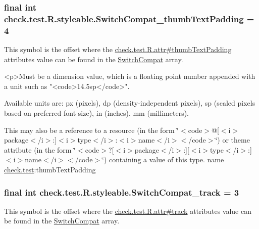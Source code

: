 \subsubsection[{Switch\+Compat\+\_\+thumb\+Text\+Padding}]{\setlength{\rightskip}{0pt plus 5cm}final int check.\+test.\+R.\+styleable.\+Switch\+Compat\+\_\+thumb\+Text\+Padding = 4\hspace{0.3cm}{\ttfamily [static]}}\label{classcheck_1_1test_1_1_r_1_1styleable_a95c824ebefc72184d7d92ae14058c7c4}
This symbol is the offset where the \hyperlink{classcheck_1_1test_1_1_r_1_1attr_a8e826d9b4743add8c93af83988130b52}{check.\+test.\+R.\+attr\#thumb\+Text\+Padding} attribute\textquotesingle{}s value can be found in the \hyperlink{classcheck_1_1test_1_1_r_1_1styleable_a0c8f3659ebec12826f8a2493fe43eaf4}{Switch\+Compat} array.

\begin{DoxyVerb}      <p>Must be a dimension value, which is a floating point number appended with a unit such as "<code>14.5sp</code>".
\end{DoxyVerb}
 Available units are\+: px (pixels), dp (density-\/independent pixels), sp (scaled pixels based on preferred font size), in (inches), mm (millimeters). 

This may also be a reference to a resource (in the form \char`\"{}$<$code$>$@\mbox{[}$<$i$>$package$<$/i$>$\+:\mbox{]}$<$i$>$type$<$/i$>$\+:$<$i$>$name$<$/i$>$$<$/code$>$\char`\"{}) or theme attribute (in the form \char`\"{}$<$code$>$?\mbox{[}$<$i$>$package$<$/i$>$\+:\mbox{]}\mbox{[}$<$i$>$type$<$/i$>$\+:\mbox{]}$<$i$>$name$<$/i$>$$<$/code$>$\char`\"{}) containing a value of this type.  name \hyperlink{namespacecheck_1_1test}{check.\+test}\+:thumb\+Text\+Padding \hypertarget{classcheck_1_1test_1_1_r_1_1styleable_a96e29bef8e291fd5b97d301aaab3e463}{}
\subsubsection[{Switch\+Compat\+\_\+track}]{\setlength{\rightskip}{0pt plus 5cm}final int check.\+test.\+R.\+styleable.\+Switch\+Compat\+\_\+track = 3\hspace{0.3cm}{\ttfamily [static]}}\label{classcheck_1_1test_1_1_r_1_1styleable_a96e29bef8e291fd5b97d301aaab3e463}
This symbol is the offset where the \hyperlink{classcheck_1_1test_1_1_r_1_1attr_a96007b76e63444b819a9c38ff1451df1}{check.\+test.\+R.\+attr\#track} attribute\textquotesingle{}s value can be found in the \hyperlink{classcheck_1_1test_1_1_r_1_1styleable_a0c8f3659ebec12826f8a2493fe43eaf4}{Switch\+Compat} array.

